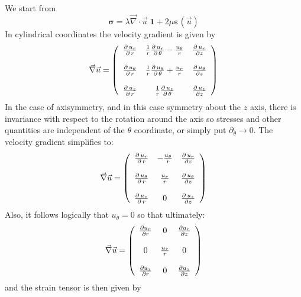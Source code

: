We start from 
\begin{equation}
{\bm \sigma} = \lambda \vec\nabla\cdot\vec{u}\;  {\bm 1}
+2 \mu {\bm \varepsilon}(\vec{u})
\label{eq:elast_as}
\end{equation}
In cylindrical coordinates the velocity gradient is given by 
\[
\vec\nabla \vec{u}  =
\left(
\begin{array}{ccc}
{\partial \, u_r \over \partial \, r} &
{1 \over r} {\partial \, u_r \over \partial \, \theta} - {u_{\theta} \over r} &
{\partial \, u_r \over \partial z} \\
\\
{\partial \, u_{\theta} \over \partial \, r} &
{1 \over r} {\partial \, u_{\theta} \over \partial \, \theta} + {u_r \over r} &
{\partial \, u_{\theta} \over \partial z} \\
\\
{\partial \, u_{z} \over \partial \, r} &
{1 \over r} {\partial \, u_{z} \over \partial \, \theta} &
{\partial \, u_{z} \over \partial z}
\end{array}
\right)
\]
In the case of axisymmetry, and in this case symmetry about the $z$ axis, there is invariance with respect to the rotation around the axis so stresses and other quantities are independent of the $\theta$ coordinate, or simply put $\partial_\theta \rightarrow 0$.
The velocity gradient simplifies to:
\[
\vec\nabla \vec{u}  =
\left(
\begin{array}{ccc}
{\partial \, u_r \over \partial \, r} &
- {u_{\theta} \over r} &
{\partial \, u_r \over \partial z} \\
\\
{\partial \, u_{\theta} \over \partial \, r} &
{u_r \over r} &
{\partial \, u_{\theta} \over \partial z} \\
\\
{\partial \, u_{z} \over \partial \, r} &
0 &
{\partial \, u_{z} \over \partial z}
\end{array}
\right)
\]
Also, it follows logically that $u_\theta=0$ so that ultimately:
\[
\vec\nabla \vec{u}  =
\left(
\begin{array}{ccc}
\frac{\partial u_r}{\partial r} & 0 & {\partial  u_r \over \partial z} \\\\
0 & {u_r \over r} & 0 \\ \\
{\partial u_{z} \over \partial  r} & 0 & {\partial  u_{z} \over \partial z}
\end{array}
\right)
\]
and the strain tensor is then given by 
